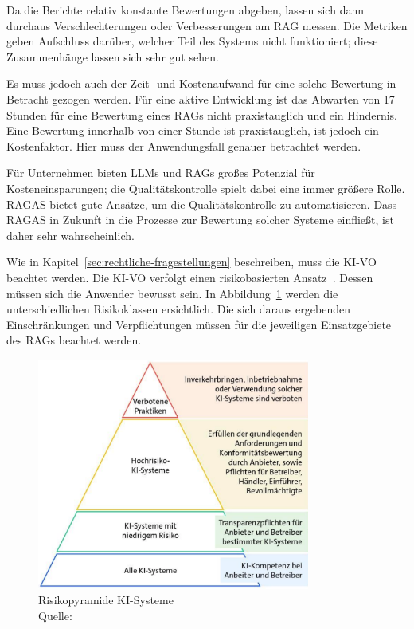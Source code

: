 Da die Berichte relativ konstante Bewertungen abgeben, lassen sich dann durchaus Verschlechterungen oder Verbesserungen am RAG messen.
Die Metriken geben Aufschluss darüber, welcher Teil des Systems nicht funktioniert; diese Zusammenhänge lassen sich sehr gut sehen.

Es muss jedoch auch der Zeit- und Kostenaufwand für eine solche Bewertung in Betracht gezogen werden.
Für eine aktive Entwicklung ist das Abwarten von 17 Stunden für eine Bewertung eines RAGs nicht praxistauglich und ein Hindernis.
Eine Bewertung innerhalb von einer Stunde ist praxistauglich, ist jedoch ein Kostenfaktor. Hier muss der Anwendungsfall genauer betrachtet werden.

Für Unternehmen bieten LLMs und RAGs großes Potenzial für Kosteneinsparungen; die Qualitätskontrolle spielt dabei eine immer größere Rolle.
RAGAS bietet gute Ansätze, um die Qualitätskontrolle zu automatisieren.
Dass RAGAS in Zukunft in die Prozesse zur Bewertung solcher Systeme einfließt, ist daher sehr wahrscheinlich.

Wie in Kapitel~\ref{sec:rechtliche-fragestellungen} beschreiben, muss die KI-VO beachtet werden.
Die KI-VO verfolgt einen risikobasierten Ansatz~\cite{Ebers2024ChatGPT}.
Dessen müssen sich die Anwender bewusst sein.
In Abbildung~\ref{fig:bitcom_ki_vo_pyramide} werden die unterschiedlichen Risikoklassen ersichtlich.
Die sich daraus ergebenden Einschränkungen und Verpflichtungen müssen für die jeweiligen Einsatzgebiete des RAGs beachtet werden.

\begin{figure}[ht!]
    \centering
    \includegraphics[width=0.8\textwidth]{images/bitcom_ki_vo_pyramide}
    \caption[Risikopyramide KI-Systme]{Risikopyramide KI-Systeme\\Quelle: \cite{Bitkom2024Umsetzungsleitfaden}}
    \label{fig:bitcom_ki_vo_pyramide}
\end{figure}


